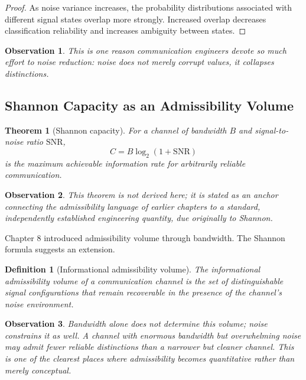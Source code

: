 \documentclass[12pt]{article}
\newtheorem{definition}{Definition}
\newtheorem{theorem}{Theorem}
\newtheorem{observation}{Observation}
\begin{document}
\begin{proof}
As noise variance increases, the probability distributions associated with different signal states overlap more strongly. Increased overlap decreases classification reliability and increases ambiguity between states.
\end{proof}

\begin{observation}
This is one reason communication engineers devote so much effort to noise reduction: noise does not merely corrupt values, it collapses distinctions.
\end{observation}

\subsection{Shannon Capacity as an Admissibility Volume}

\begin{theorem}[Shannon capacity]
For a channel of bandwidth $B$ and signal-to-noise ratio $\mathrm{SNR}$,
\[
C = B\log_2(1+\mathrm{SNR})
\]
is the maximum achievable information rate for arbitrarily reliable communication.
\end{theorem}

\begin{observation}
This theorem is not derived here; it is stated as an anchor connecting the admissibility language of earlier chapters to a standard, independently established engineering quantity, due originally to Shannon.
\end{observation}

Chapter 8 introduced admissibility volume through bandwidth. The Shannon formula suggests an extension.

\begin{definition}[Informational admissibility volume]
The informational admissibility volume of a communication channel is the set of distinguishable signal configurations that remain recoverable in the presence of the channel's noise environment.
\end{definition}

\begin{observation}
Bandwidth alone does not determine this volume; noise constrains it as well. A channel with enormous bandwidth but overwhelming noise may admit fewer reliable distinctions than a narrower but cleaner channel. This is one of the clearest places where admissibility becomes quantitative rather than merely conceptual.
\end{observation}
\end{document}
